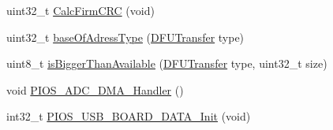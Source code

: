 \begin{DoxyCompactItemize}
\item 
uint32\-\_\-t \hyperlink{group___copter_control_b_l_ga9eb702c0c89bbf54545553d141c5cfa6}{\-Calc\-Firm\-C\-R\-C} (void)
\item 
uint32\-\_\-t \hyperlink{group___copter_control_b_l_ga90ec1a350e3192abce917e9f10b989ec}{base\-Of\-Adress\-Type} (\hyperlink{group___copter_control_b_l_ga0b23a3b03386f81782f1b57b69804064}{\-D\-F\-U\-Transfer} type)
\item 
uint8\-\_\-t \hyperlink{group___copter_control_b_l_ga8122c172146d51c7fc782ad4981162a6}{is\-Bigger\-Than\-Available} (\hyperlink{group___copter_control_b_l_ga0b23a3b03386f81782f1b57b69804064}{\-D\-F\-U\-Transfer} type, uint32\-\_\-t size)
\item 
void \hyperlink{group___copter_control_b_l_ga2499ecd72ab7c7fd6becbb2282f2e5d8}{\-P\-I\-O\-S\-\_\-\-A\-D\-C\-\_\-\-D\-M\-A\-\_\-\-Handler} ()
\item 
int32\-\_\-t \hyperlink{group___copter_control_b_l_ga5efd94ab761f254827f38dba474cf642}{\-P\-I\-O\-S\-\_\-\-U\-S\-B\-\_\-\-B\-O\-A\-R\-D\-\_\-\-D\-A\-T\-A\-\_\-\-Init} (void)
\end{DoxyCompactItemize}
